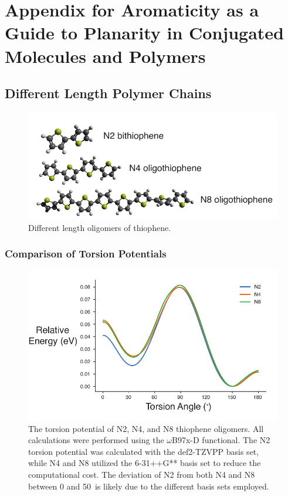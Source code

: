 \chapter{Appendix for Aromaticity as a Guide to Planarity in Conjugated Molecules and Polymers}

\section{Different Length Polymer Chains}\label{sec:aroma_diff_len_poly}
\begin{figure}[hbt!]
    \centering
    \includegraphics{figures/append_aroma/p_chains_graphic_copy.pdf}
    \caption[Different Length Thiophene Oligomers]{Different length oligomers of thiophene.}
    \label{fig:p_chains}
\end{figure}

\subsection{Comparison of Torsion Potentials}
\begin{figure}[hbt!]
    \centering
    \includegraphics{figures/append_aroma/p_tor_compare_copy.pdf}
    \caption[Torsion Potential of Different Length Thiophene Oligomers]{The torsion potential of N2, N4, and N8 thiophene oligomers. All calculations were performed using the $\omega$B97x-D functional. The N2 torsion potential was calculated with the def2-TZVPP basis set, while N4 and N8 utilized the 6-31++G** \cite{Hehre1972} basis set to reduce the computational cost. The deviation of N2 from both N4 and N8 between 0 and 50\textdegree \ is likely due to the different basis sets employed.}
    \label{fig:p_tor_compare}
\end{figure}

